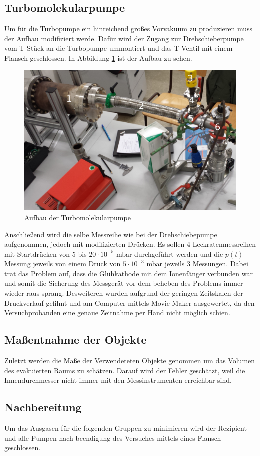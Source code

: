 \subsection{Turbomolekularpumpe}
Um für die Turbopumpe ein hinreichend großes Vorvakuum zu produzieren muss der Aufbau modifiziert werde. Dafür wird der Zugang zur Drehschieberpumpe vom T-Stück an die Turbopumpe ummontiert und das T-Ventil mit einem Flansch geschlossen. In Abbildung \ref{fig:Turbo} ist der Aufbau zu sehen.
\begin{figure}[htpb]
  \centering
  \includegraphics[width=\textwidth]{picture/Aufgabe2.jpg}
  \caption{Aufbau der Turbomolekularpumpe}
  \label{fig:Turbo}
\end{figure}
Anschließend wird die selbe Messreihe wie bei der Drehschiebepumpe aufgenommen, jedoch mit modifizierten Drücken. Es sollen 4 Leckratenmessreihen mit Startdrücken von 5 bis $20 \cdot 10^{-5}$ mbar durchgeführt werden und die $p(t)$-Messung jeweils von einem Druck von $5 \cdot 10^{-3}$ mbar jeweils 3 Messungen. Dabei trat das Problem auf, dass die Glühkathode mit dem Ionenfänger verbunden war und somit die Sicherung des Messgerät vor dem beheben des Problems immer wieder raus sprang. Desweiteren wurden aufgrund der geringen Zeitskalen der Druckverlauf gefilmt und am Computer mittels Movie-Maker ausgewertet, da den Versuchprobanden eine genaue Zeitnahme per Hand nicht möglich schien.
\subsection{Maßentnahme der Objekte}
Zuletzt werden die Maße der Verwendeteten Objekte genommen um das Volumen des evakuierten Raums zu schätzen. Darauf wird der Fehler geschätzt, weil die Innendurchmesser nicht immer mit den Messinstrumenten erreichbar sind.
\subsection{Nachbereitung}
Um das Ausgasen für die folgenden Gruppen zu minimieren wird der Rezipient und alle Pumpen nach beendigung des Versuches mittels eines Flansch geschlossen.
